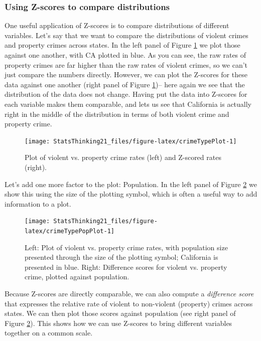 \documentclass[12pt,]{book}
\theoremstyle{definition}
\theoremstyle{definition}
\theoremstyle{definition}
\theoremstyle{remark}
\begin{document}
\hypertarget{using-z-scores-to-compare-distributions}{%
\subsubsection{Using Z-scores to compare distributions}\label{using-z-scores-to-compare-distributions}}

One useful application of Z-scores is to compare distributions of different variables. Let's say that we want to compare the distributions of violent crimes and property crimes across states. In the left panel of Figure \ref{fig:crimeTypePlot} we plot those against one another, with CA plotted in blue. As you can see, the raw rates of property crimes are far higher than the raw rates of violent crimes, so we can't just compare the numbers directly. However, we can plot the Z-scores for these data against one another (right panel of Figure \ref{fig:crimeTypePlot})-- here again we see that the distribution of the data does not change. Having put the data into Z-scores for each variable makes them comparable, and lets us see that California is actually right in the middle of the distribution in terms of both violent crime and property crime.

\begin{figure}
\texttt{[image: StatsThinking21\_files/figure-latex/crimeTypePlot-1]} \caption{Plot of violent vs. property crime rates (left) and Z-scored rates (right).}\label{fig:crimeTypePlot}
\end{figure}

Let's add one more factor to the plot: Population. In the left panel of Figure \ref{fig:crimeTypePopPlot} we show this using the size of the plotting symbol, which is often a useful way to add information to a plot.

\begin{figure}
\texttt{[image: StatsThinking21\_files/figure-latex/crimeTypePopPlot-1]} \caption{Left: Plot of violent vs. property crime rates, with population size presented through the size of the plotting symbol; California is presented in blue. Right: Difference scores for violent vs. property crime, plotted against population. }\label{fig:crimeTypePopPlot}
\end{figure}

Because Z-scores are directly comparable, we can also compute a \emph{difference score} that expresses the relative rate of violent to non-violent (property) crimes across states. We can then plot those scores against population (see right panel of Figure \ref{fig:crimeTypePopPlot}). This shows how we can use Z-scores to bring different variables together on a common scale.
\end{document}
